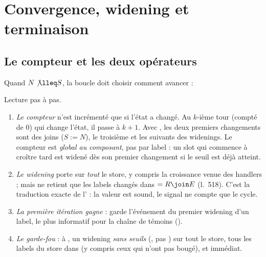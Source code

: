 \section{Convergence, widening et terminaison}
\label{sec:point-fixe-composant-convergence}

\subsection{Le compteur et les deux opérateurs}

Quand $N \not\lleq S$, la boucle doit choisir comment avancer :


Lecture pas à pas.

\begin{enumerate}
  \item \emph{Le compteur}  n'est incrémenté que si l'état a
    changé. Au $k$-ième tour (compté de 0) qui change l'état, il passe à
    $k+1$. Avec , les deux premiers changements
    sont des joins ($S := N$), le troisième et les suivants des widenings.
    Le compteur est \emph{global au composant}, pas par label : un slot qui
    commence à croître tard est widené dès son premier changement si le
    seuil est déjà atteint.
  \item \emph{Le widening}  porte
    sur \emph{tout} le store, y compris la croissance venue des handlers ;
    mais  ne retient que les labels changés dans
     $= R \join E$ (l.~518). C'est la traduction
    exacte de l' : la valeur est sound, le signal ne compte que le
    cycle.
  \item \emph{La première itération gagne} :  garde
    l'événement du premier widening d'un label, le plus informatif pour la
    chaîne de témoins ().
  \item \emph{Le garde-fou} : à , un widening
    \emph{sans seuils} (, pas ) sur tout le store,
    tous les labels du store dans  (y compris ceux qui
    n'ont pas bougé), et  immédiat.
\end{enumerate}

